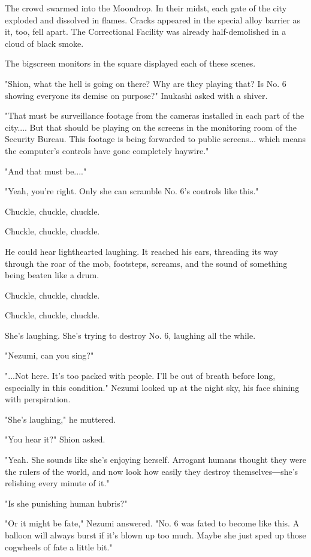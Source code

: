 The crowd swarmed into the Moondrop. In their midst, each gate of the
city exploded and dissolved in flames. Cracks appeared in the special
alloy barrier as it, too, fell apart. The Correctional Facility was
already half-demolished in a cloud of black smoke.

The bigscreen monitors in the square displayed each of these scenes.

"Shion, what the hell is going on there? Why are they playing that? Is
No. 6 showing everyone its demise on purpose?" Inukashi asked with a
shiver.

"That must be surveillance footage from the cameras installed in each
part of the city.... But that should be playing on the screens in the
monitoring room of the Security Bureau. This footage is being forwarded
to public screens... which means the computer's controls have gone
completely haywire."

"And that must be...."

"Yeah, you're right. Only she can scramble No. 6's controls like this."

Chuckle, chuckle, chuckle.

Chuckle, chuckle, chuckle.

He could hear lighthearted laughing. It reached his ears, threading its
way through the roar of the mob, footsteps, screams, and the sound of
something being beaten like a drum.

Chuckle, chuckle, chuckle.

Chuckle, chuckle, chuckle.

She's laughing. She's trying to destroy No. 6, laughing all the while.

"Nezumi, can you sing?"

"...Not here. It's too packed with people. I'll be out of breath before
long, especially in this condition." Nezumi looked up at the night sky,
his face shining with perspiration.

"She's laughing," he muttered.

"You hear it?" Shion asked.

"Yeah. She sounds like she's enjoying herself. Arrogant humans thought
they were the rulers of the world, and now look how easily they destroy
themselves―she's relishing every minute of it."

"Is she punishing human hubris?"

"Or it might be fate," Nezumi answered. "No. 6 was fated to become like
this. A balloon will always burst if it's blown up too much. Maybe she
just sped up those cogwheels of fate a little bit."


